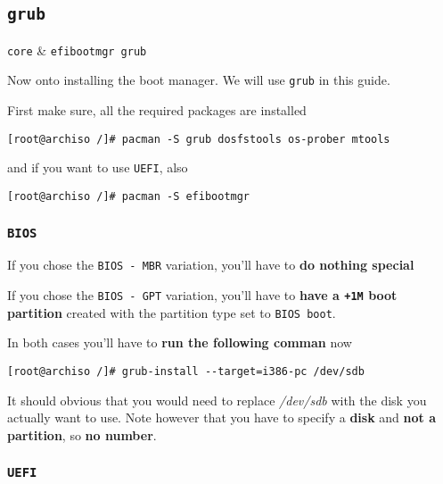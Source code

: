 \documentclass[10pt]{dustdoc}
\begin{document}
\subsection{\texttt{grub}}
\label{sec:grub}

\begin{packagetable}
    \texttt{core} & \texttt{efibootmgr grub} \\ 
\end{packagetable}

Now onto installing the boot manager.
We will use \texttt{grub} in this guide.

First make sure, all the required packages are installed

\begin{verbatim}
[root@archiso /]# pacman -S grub dosfstools os-prober mtools
\end{verbatim}

\noindent
and if you want to use \texttt{UEFI}, also

\begin{verbatim}
[root@archiso /]# pacman -S efibootmgr
\end{verbatim}

\subsubsection{\texttt{BIOS}}
\label{sec:bios}

If you chose the \texttt{BIOS - MBR} variation, you’ll have to \textbf{do nothing special}

If you chose the \texttt{BIOS - GPT} variation, you’ll have to \textbf{have a \texttt{+1M} boot partition} created with the partition type set to \texttt{BIOS boot}.

In both cases you’ll have to \textbf{run the following comman} now

\begin{verbatim}
[root@archiso /]# grub-install --target=i386-pc /dev/sdb
\end{verbatim}

\begin{NOTE}
    It should obvious that you would need to replace \textit{/dev/sdb} with the disk you actually want to use.
    Note however that you have to specify a \textbf{disk} and \textbf{not a partition}, so \textbf{no number}.
\end{NOTE}

\subsubsection{\texttt{UEFI}}
\label{sec:uefi}
\end{document}
